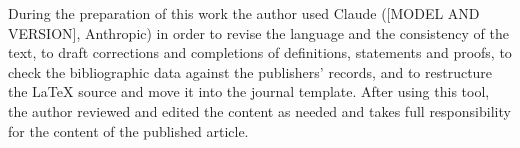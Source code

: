 %
%
%
%
%        

During the preparation of this work the author used Claude ([MODEL AND VERSION], Anthropic) in order to revise the language and the consistency of the text, to draft corrections and completions of definitions, statements and proofs, to check the bibliographic data against the publishers' records, and to restructure the LaTeX source and move it into the journal template.
After using this tool, the author reviewed and edited the content as needed and takes full responsibility for the content of the published article.
